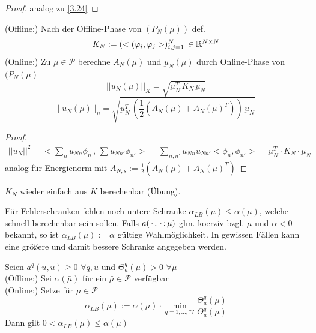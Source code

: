 \begin{proof}
	analog zu \ref{3.24}
\end{proof}

\begin{kor}
	(Offline:) Nach der Offline-Phase von $(P_N(\mu))$ def.
	\[
		K_N := (<(\varphi_i,\varphi_j>)_{i,j=1}^N \, \in \mathbb{R}^{N \times N}
	\]
	(Online:) Zu $\mu \in \mathcal{P}$ berechne $A_N(\mu)$ und $\underbar u_N(\mu)$ durch Online-Phase von $(P_N(\mu)$
	\[
		|| u_N(\mu)||_X = \sqrt{\underbar u_N^T \, K_N \, \underbar u_N}
	\]
	\[
		|| u_N(\mu)||_{\mu} = \sqrt{\underbar u_N^T \, (\frac{1}{2} (A_N(\mu) + A_N(\mu)^T)) \, \underbar u_N}
	\]
\end{kor}

\begin{proof}
	\begin{align*}
		||u_N||^2 = <\sum_n u_{Nn} \phi_n \, , \, \sum u_{Nn'} \phi_{n'}> = \sum_{n, n'} u_{Nn} u_{Nn'} <\phi_n, \phi_{n'}> = \underbar u_N^T \cdot K_N \cdot \underbar u_N
	\end{align*}	
	analog für Energienorm mit $A_{N,s} := \frac{1}{2} (A_N(\mu) + A_N(\mu)^T)$
\end{proof}

\begin{bem}
	$K_N$ wieder einfach aus $K$ berechenbar (Übung).
\end{bem}

Für Fehlerschranken fehlen noch untere Schranke $\alpha_{LB} (\mu) \le \alpha (\mu)$, welche schnell berechenbar sein sollen.
Falls $a(\,\cdot\, , \,\cdot\, ; \mu)$ glm. koerziv bzgl. $\mu$ und $\bar{\alpha} < 0$ bekannt, so ist $\alpha_{LB} (\mu) := \bar{\alpha}$ gültige Wahlmöglichkeit.
In gewissen Fällen kann eine größere und damit bessere Schranke angegeben werden.

\begin{satz}
	Seien $a^q(u,u) \geq 0 \,\, \forall q,u$ und $\Theta_a^q (\mu) > 0 \,\, \forall \mu$ \\
	(Offline:) Sei $\alpha(\bar{\mu})$ für ein $\bar{\mu} \in \mathcal{P}$ verfügbar \\
	(Online:) Setze für $\mu \in \mathcal{P}$
	\[
		\alpha_{LB} (\mu) := \alpha(\bar{\mu}) \cdot \min_{q=1,\dots,??} \frac{\Theta_a^q(\mu)}{\Theta_a^q(\bar{\mu})}
	\]
	Dann gilt $0 < \alpha_{LB} (\mu) \leq \alpha(\mu)$
\end{satz}

